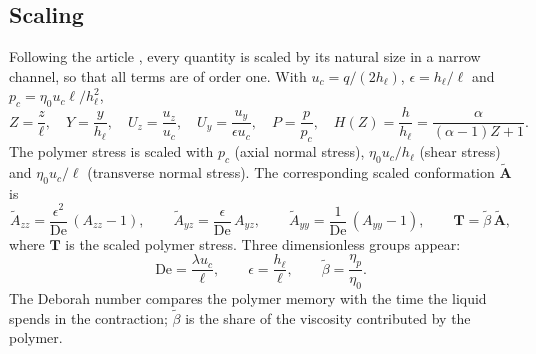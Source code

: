 \documentclass[11pt,a4paper]{article}
\newcommand{\De}{\mathrm{De}}
\newcommand{\bt}{\tilde\beta}
\begin{document}
\subsection{Scaling}
Following the article \cite{boyko2022}, every quantity is scaled by its natural size in a narrow channel, so that all terms are of order one. With $u_c=q/(2h_\ell)$, $\epsilon=h_\ell/\ell$ and $p_c=\eta_0u_c\ell/h_\ell^2$,
\begin{equation}
Z=\frac{z}{\ell},\quad Y=\frac{y}{h_\ell},\quad U_z=\frac{u_z}{u_c},\quad U_y=\frac{u_y}{\epsilon u_c},\quad P=\frac{p}{p_c},\quad H(Z)=\frac{h}{h_\ell}=\frac{\alpha}{(\alpha-1)Z+1}.
\label{eq:scales}
\end{equation}
The polymer stress is scaled with $p_c$ (axial normal stress), $\eta_0u_c/h_\ell$ (shear stress) and $\eta_0u_c/\ell$ (transverse normal stress). The corresponding scaled conformation $\tilde{\mathbf A}$ is
\begin{equation}
\tilde A_{zz}=\frac{\epsilon^2}{\De}\,(A_{zz}-1),\qquad
\tilde A_{yz}=\frac{\epsilon}{\De}\,A_{yz},\qquad
\tilde A_{yy}=\frac{1}{\De}\,(A_{yy}-1),\qquad
\mathbf T=\bt\,\tilde{\mathbf A},
\label{eq:Ascale}
\end{equation}
where $\mathbf T$ is the scaled polymer stress. Three dimensionless groups appear:
\begin{equation}
\De=\frac{\lambda u_c}{\ell},\qquad \epsilon=\frac{h_\ell}{\ell},\qquad \bt=\frac{\eta_p}{\eta_0}.
\label{eq:groups}
\end{equation}
The Deborah number compares the polymer memory with the time the liquid spends in the contraction; $\bt$ is the share of the viscosity contributed by the polymer.
\end{document}
